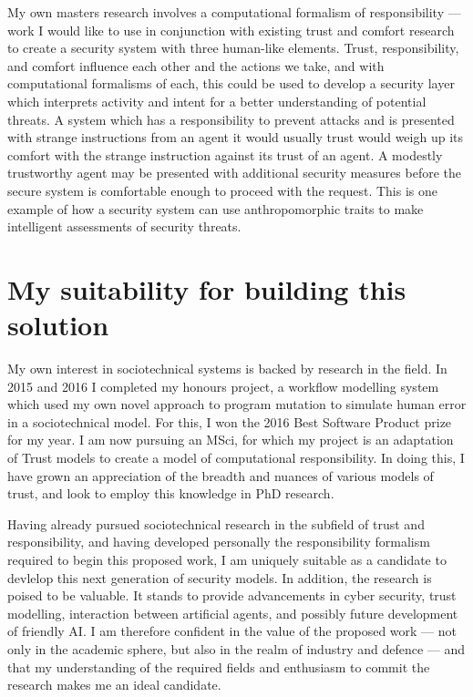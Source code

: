 \documentclass{tufte-handout}
\begin{document}
My own masters research involves a computational formalism of responsibility --- work I would like to use in conjunction with existing trust and comfort research to create a security system with three human-like elements. Trust, responsibility, and comfort influence each other and the actions we take, and with computational formalisms of each, this could be used to develop a security layer which interprets activity and intent for a better understanding of potential threats. A system which has a responsibility to prevent attacks and is presented with strange instructions from an agent it would usually trust would weigh up its comfort with the strange instruction against its trust of an agent. A modestly trustworthy agent may be presented with additional security measures before the secure system is comfortable enough to proceed with the request. This is one example of how a security system can use anthropomorphic traits to make intelligent assessments of security threats.\par

\section{My suitability for building this solution}
My own interest in sociotechnical systems is backed by research in the field. In 2015 and 2016 I completed my honours project, a workflow modelling system which used my own novel approach to program mutation to simulate human error in a sociotechnical model. For this, I won the 2016 Best Software Product prize for my year. I am now pursuing an MSci, for which my project is an adaptation of Trust models to create a model of computational responsibility. In doing this, I have grown an appreciation of the breadth and nuances of various models of trust, and look to employ this knowledge in PhD research.\par

Having already pursued sociotechnical research in the subfield of trust and responsibility, and having developed personally the responsibility formalism required to begin this proposed work, I am uniquely suitable as a candidate to devlelop this next generation of security models. In addition, the research is poised to be valuable. It stands to provide advancements in cyber security, trust modelling, interaction between artificial agents, and possibly future development of friendly AI. I am therefore confident in the value of the proposed work --- not only in the academic sphere, but also in the realm of industry and defence --- and that my understanding of the required fields and enthusiasm to commit the research makes me an ideal candidate.



\end{document}
